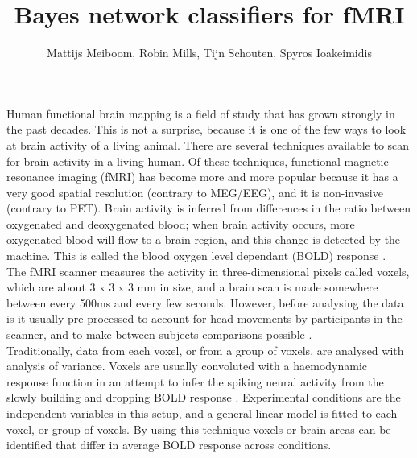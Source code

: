 \documentclass[preprint,journal]{vgtc}
\title{Bayes network classifiers for fMRI}
\author{Mattijs Meiboom, Robin Mills, Tijn Schouten, Spyros Ioakeimidis}
\begin{document}
\label{sec:introduction}
\maketitle
Human functional brain mapping is a field of study that has grown strongly in the past decades. This is not a surprise, because it is one of the few ways to look at brain activity of a living animal. There are several techniques available to scan for brain activity in a living human. Of these techniques, functional magnetic resonance imaging (fMRI) has become more and more popular because it has a very good spatial resolution (contrary to MEG/EEG), and it is non-invasive (contrary to PET). Brain activity is inferred from differences in the ratio between oxygenated and deoxygenated blood; when brain activity occurs, more oxygenated blood will flow to a brain region, and this change is detected by the machine. This is called the blood oxygen level dependant (BOLD) response \cite{sm:2012fMRI}.\\
\indent The fMRI scanner measures the activity in three-dimensional pixels called voxels, which are about 3 x 3 x 3 mm in size, and a brain scan is made somewhere between every 500ms and every few seconds. However, before analysing the data is it usually pre-processed to account for head movements by participants in the scanner, and to make between-subjects comparisons possible \cite{sl:2009rl}.\\
\indent Traditionally, data from each voxel, or from a group of voxels, are analysed with analysis of variance. Voxels are usually convoluted with a haemodynamic response function in an attempt to infer the spiking neural activity from the slowly building and dropping BOLD response \cite{he:2002na}. Experimental conditions are the independent variables in this setup, and a general linear model is fitted to each voxel, or group of voxels. By using this technique voxels or brain areas can be identified that differ in average BOLD response across conditions.\\
\end{document}
